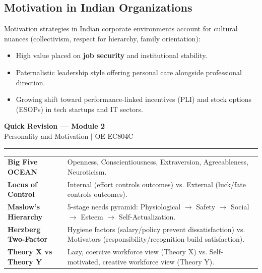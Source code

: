 \documentclass[12pt,a4paper]{article}
\renewcommand{\arraystretch}{1.45}
\begin{document}
\subsection{Motivation in Indian Organizations}
Motivation strategies in Indian corporate environments account for cultural nuances (collectivism, respect for hierarchy, family orientation):
\begin{itemize}[leftmargin=*, itemsep=3pt]
  \item High value placed on \textbf{job security} and institutional stability.
  \item Paternalistic leadership style offering personal care alongside professional direction.
  \item Growing shift toward performance-linked incentives (PLI) and stock options (ESOPs) in tech startups and IT sectors.
\end{itemize}

\newpage
\begin{center}
  {\large\bfseries\color{myred} Quick Revision --- Module 2}\\[3pt]
  {\small\color{mydark} Personality and Motivation $|$ OE-EC804C}
\end{center}
\vspace{-4pt}
\hrule
\vspace{8pt}

\begin{tcolorbox}[formulabox, title={\textbf{Key Concepts and Metrics at a Glance}}]
\renewcommand{\arraystretch}{1.35}
\begin{tabularx}{\linewidth}{>{\raggedright\arraybackslash\bfseries}p{4.5cm} X}
Big Five OCEAN & Openness, Conscientiousness, Extraversion, Agreeableness, Neuroticism. \\[4pt]
Locus of Control & Internal (effort controls outcomes) vs. External (luck/fate controls outcomes). \\[4pt]
Maslow's Hierarchy & 5-stage needs pyramid: Physiological $\to$ Safety $\to$ Social $\to$ Esteem $\to$ Self-Actualization. \\[4pt]
Herzberg Two-Factor & Hygiene factors (salary/policy prevent dissatisfaction) vs. Motivators (responsibility/recognition build satisfaction). \\[4pt]
Theory X vs Theory Y & Lazy, coercive workforce view (Theory X) vs. Self-motivated, creative workforce view (Theory Y). \\
\end{tabularx}
\end{tcolorbox}
\end{document}
